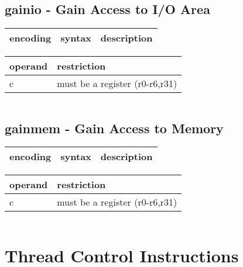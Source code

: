 \documentclass[letterpaper,10pt,openright,twoside,onecolumn]{book}
\begin{document}
  \begin{verbatim}
  \end{verbatim}
\newpage\subsection{gainio - Gain Access to I/O Area}
  \begin{tabular}{|l|l|l|}
   \hline
    encoding & syntax & description \\
   \hline
   \hline
  \end{tabular}
  \flushleft
  \begin{tabular}{|l|l|}
   \hline
    operand & restriction \\
   \hline
    c & must be a register (r0-r6,r31) \\
   \hline
  \end{tabular}
  \begin{verbatim}
  \end{verbatim}
\newpage\subsection{gainmem - Gain Access to Memory}
  \begin{tabular}{|l|l|l|}
   \hline
    encoding & syntax & description \\
   \hline
   \hline
  \end{tabular}
  \flushleft
  \begin{tabular}{|l|l|}
   \hline
    operand & restriction \\
   \hline
    c & must be a register (r0-r6,r31) \\
   \hline
  \end{tabular}
  \begin{verbatim}
  \end{verbatim}

\clearpage\section{Thread Control Instructions}
\end{document}
